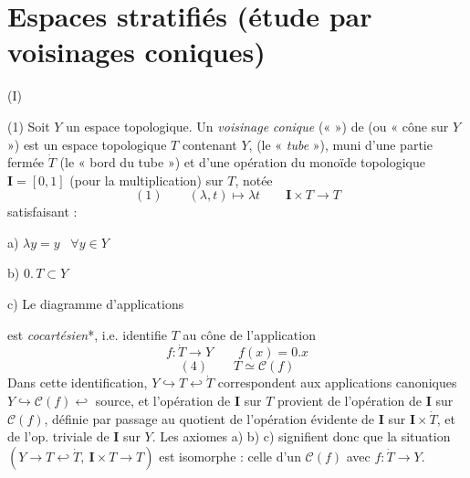 \documentclass[11pt,a4paper]{article}
\begin{document}
\section*{Espaces stratifiés (étude par voisinages coniques)}


(I)

(1) Soit $Y$ un espace topologique. Un \emph{voisinage}  \emph{conique} («  ») de  (ou « cône sur $Y$ »)  est un espace topologique $T$ \struck{\ill{}} contenant $Y$, (le « \emph{tube} »), muni d'une partie fermée $\dot T$ (le « bord du tube ») et d'une opération du monoïde topologique $\mathbf{I}=[0,1]$ (pour la multiplication) sur $T$, notée
\[
(1)\qquad (\lambda,t)\longmapsto\lambda t\qquad \mathbf{I}\times T\longrightarrow T
\]
satisfaisant :

a) $\lambda y=y$ \ $\forall y\in Y$

b) $0.\,T\subset Y$ \struck{\ill{}}


c) Le  diagramme d'applications



est \emph{cocartésien}*, i.e. identifie $T$ au cône de l'application
\[
f:\dot T\longrightarrow Y\qquad f(x)=0.x
\]
\[
(4)\qquad T\simeq\mathcal{C}(f)
\]
Dans cette identification, $Y\hookrightarrow T\hookleftarrow\dot T$ correspondent aux applications canoniques \struck{\ill{}}  $Y\hookrightarrow\mathcal{C}(f)\hookleftarrow$ source, et l'opération de $\mathbf{I}$ sur $T$ provient de l'opération de $\mathbf{I}$ sur $\mathcal{C}(f)$, définie par passage au quotient de l'opération évidente de $\mathbf{I}$ sur $\mathbf{I}\times\dot T$, et de l'op. triviale de $\mathbf{I}$ sur $Y$. Les axiomes a) b) c) signifient donc que la situation $(Y\to T\hookleftarrow\dot T,\ \mathbf{I}\times T\to T)$ est isomorphe : celle d'un $\mathcal{C}(f)$ avec $f:\dot T\to Y$.
\end{document}
